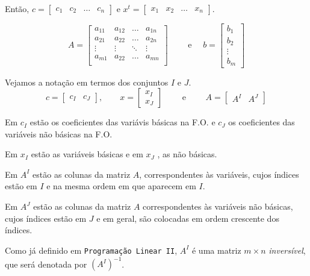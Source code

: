Então, $ c = \begin{bmatrix} c_1 & c_2 & \ldots & c_n \end{bmatrix} $ e 
$ x^{t} = \begin{bmatrix} x_1 & x_2 & \ldots & x_n \end{bmatrix} $.

\[
  A = \begin{bmatrix}
        a_{11} & a_{12} & \ldots & a_{1n} \\
        a_{21} & a_{22} & \ldots & a_{2n} \\
        \vdots & \vdots & \ddots & \vdots \\
        a_{m1} & a_{22} & \ldots & a_{mn} \\
      \end{bmatrix}
  \qquad
  \text{ e }
  \quad
  b = \begin{bmatrix}
        b_1 \\ 
        b_2 \\ 
        \vdots \\ 
        b_m
      \end{bmatrix}
\]

Vejamos a notação em termos dos conjuntos $ I $ e $ J $.
\[
  c = \begin{bmatrix}
        c_{I} & c_{J}
      \end{bmatrix},
  \qquad
  x = \begin{bmatrix}
        x_{I} \\
        x_{J}
      \end{bmatrix}
  \qquad
  \text{ e }
  \qquad
  A = \begin{bmatrix}
        A^{I} & A^{J}
      \end{bmatrix}
\]

Em $ c_I $ estão os coeficientes das variávis básicas na F.O. e $ c_J $ os 
coeficientes das variáveis não básicas na F.O.

Em $ x_{I} $ estão as variáveis básicas e em $ x_J $ , as não básicas.

Em $ A^{I} $ estão as colunas da matriz $ A $, correspondentes às variáveis,
cujos índices estão em $ I $ e na mesma  ordem em que aparecem em $ I $.

Em $ A^{J} $ estão as colunas da matriz $ A $ correspondentes às variáveis não
básicas, cujos índices estão em $ J $ e em geral, são colocadas em ordem 
crescente dos índices.

Como já definido em \texttt{Programação Linear II}, $ A^{I} $ é uma matriz 
$ m \times n $ \textit{inversível}, que será denotada por 
$ \left(A^I\right)^{-1} $.

